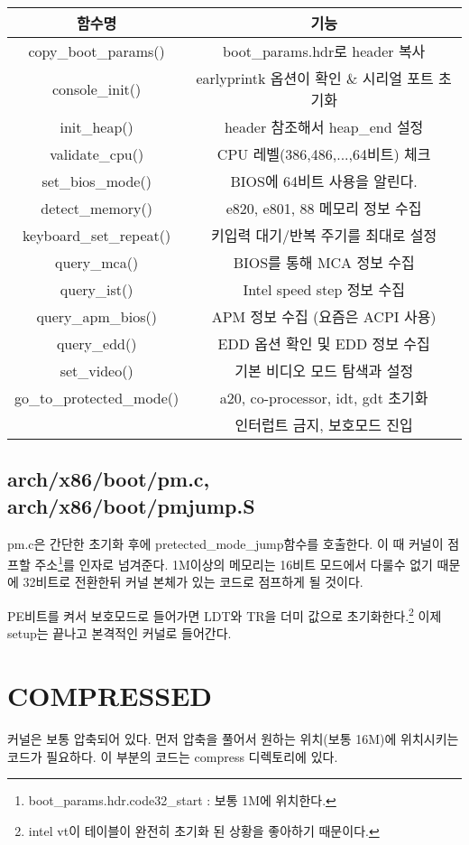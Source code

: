 \documentclass[a4paper,11pt]{report}
\begin{document}
\begin{CJK}{UTF8}{}
\begin{tabular}{|c|c|} \hline
함수명 & 기능 \\\hline
copy\_boot\_params() & boot\_params.hdr로 header 복사 \\\hline
console\_init() & earlyprintk 옵션이 확인 \& 시리얼 포트 초기화 \\\hline
init\_heap() & header 참조해서 heap\_end 설정\\\hline
validate\_cpu()	 & CPU 레벨(386,486,...,64비트) 체크\\\hline
set\_bios\_mode() & BIOS에 64비트 사용을 알린다. \\\hline
detect\_memory() & e820, e801, 88 메모리 정보 수집\\\hline
keyboard\_set\_repeat() & 키입력 대기/반복 주기를 최대로 설정 \\\hline
query\_mca() & BIOS를 통해 MCA 정보 수집 \\\hline
query\_ist() & Intel speed step 정보 수집 \\\hline
query\_apm\_bios() & APM 정보 수집 (요즘은 ACPI 사용)\\\hline
query\_edd() & EDD 옵션 확인 및 EDD 정보 수집 \\\hline
set\_video() & 기본 비디오 모드 탐색과 설정\\\hline
go\_to\_protected\_mode() & a20, co-processor, idt, gdt 초기화\\
& 인터럽트 금지, 보호모드 진입\\
\hline

\end{tabular}

\section{arch/x86/boot/pm.c, arch/x86/boot/pmjump.S}
pm.c은 간단한 초기화 후에 pretected\_mode\_jump함수를 호출한다. 이 때 커널이 점프할 주소\footnote{boot\_params.hdr.code32\_start : 보통 1M에 위치한다.}를 인자로 넘겨준다. 1M이상의 메모리는 16비트 모드에서 다룰수 없기 때문에 32비트로 전환한뒤 커널 본체가 있는 코드로 점프하게 될 것이다.

PE비트를 켜서 보호모드로 들어가면 LDT와 TR을 더미 값으로 초기화한다.\footnote{intel vt이 테이블이 완전히 초기화 된 상황을 좋아하기 때문이다.}
이제 setup는 끝나고 본격적인 커널로 들어간다.

\chapter{COMPRESSED}
커널은 보통 압축되어 있다. 먼저 압축을 풀어서 원하는 위치(보통 16M)에 위치시키는 코드가 필요하다.
이 부분의 코드는 compress 디렉토리에 있다.

\end{CJK}
\end{document}
